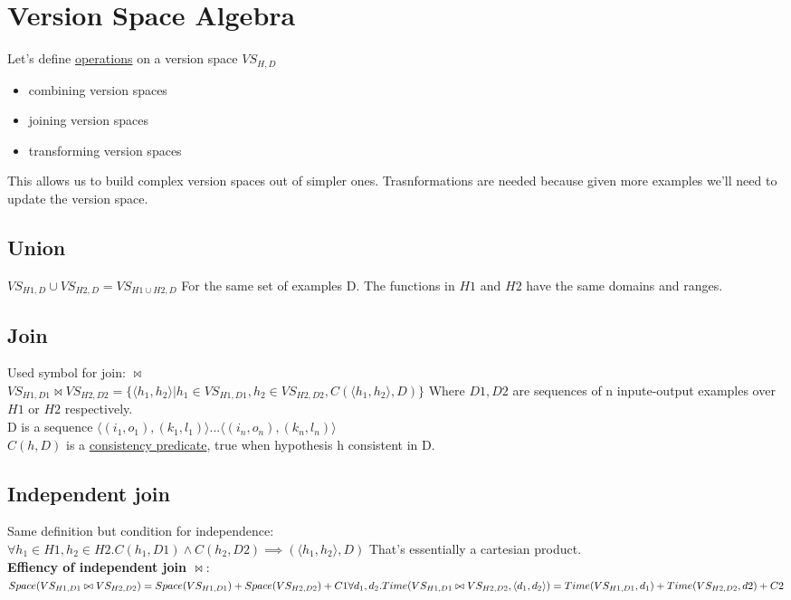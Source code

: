 \section{Version Space Algebra}
Let's define \underline{operations} on a version space $VS_{H,D}$
\begin{itemize}
\item combining version spaces
\item joining version spaces
\item transforming version spaces
\end{itemize}
This allows us to build complex version spaces out of simpler ones. Trasnformations are needed because given more examples we'll need to update the version space. 
\subsection{Union}
$VS_{H1,D} \cup VS_{H2,D} = VS_{H1 \cup H2, D}$
For the same set of examples D. The functions in $H1$ and $H2$ have the same domains and ranges.
\subsection{Join}
Used symbol for join: $\bowtie$\\
$VS_{H1,D1} \bowtie VS_{H2,D2} = \{\langle h_1,h_2 \rangle | h_1 \in VS_{H1,D1}, h_2 \in VS_{H2,D2}, C(\langle h_1, h_2\rangle, D)\}$
Where $D1,D2$ are sequences of n inpute-output examples over $H1$ or $H2$ respectively.\\
D is a sequence $\langle (i_1,o_1), (k_1,l_1) \rangle ... \langle (i_n, o_n), (k_n, l_n) \rangle$\\
$C(h,D)$ is a \underline{consistency predicate}, true when hypothesis h consistent in D.
\subsection{Independent join}
Same definition but condition for independence:\\
$\forall h_1 \in H1, h_2 \in H2 . C(h_1, D1) \wedge C(h_2, D2) \implies (\langle h_1, h_2 \rangle, D)$ That's essentially a cartesian product.\\ 
\textbf{Effiency of independent join $\bowtie$}:\\
$Space(VS_{H1,D1} \bowtie VS_{H2,D2}) = Space(VS_{H1,D1}) + Space(VS_{H2,D2})+C1\\ \forall d_1, d_2 . Time(VS_{H1,D1} \bowtie VS_{H2,D2}, \langle d_1, d_2 \rangle) = Time(VS_{H1,D1}, d_1) + Time(VS_{H2,D2}, d2) + C2$
